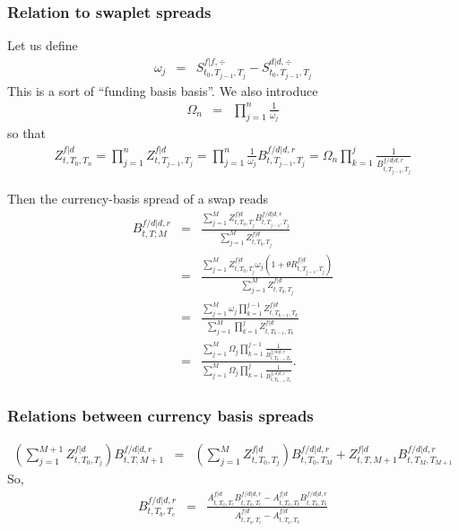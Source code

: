 \documentclass[11pt,english]{amsart}
\theoremstyle{definition}
\begin{document}
\subsubsection{Relation to swaplet spreads}
Let us define  
\begin{eqnarray}
	\omega_j  &=& S^{f|f,\div}_{t_0,T_{j-1},T_j}  -  S^{d|d,\div}_{t_0,T_{j-1},T_j} 
\end{eqnarray}
This is a sort of ``funding basis basis''. We also introduce 
\begin{eqnarray}
	\Omega_n &=& \prod_{j=1}^n \frac{1}{\omega_j}
\end{eqnarray}
so that
\begin{eqnarray*}
	Z^{f|d}_{t,T_0,T_n} 
	= \prod_{j=1}^n Z^{f|d}_{t,T_{j-1},T_j}  
	= \prod_{j=1}^n \frac{1}{\omega_j} B^{f/d|d,r}_{t,T_{j-1},T_j}  
	= \Omega_n \prod_{k=1}^j \frac{1}{B^{f/d|d,r}_{t,T_{j-1},T_j}}  
\end{eqnarray*}


Then the currency-basis spread of a swap reads  
\begin{eqnarray*}
	B^{f/d|d,r}_{t,T;M}  
	&=& \frac{\sum_{j=1}^{M}   Z^{f|d}_{t,T_0,T_j} B^{f/d|d,r}_{t,T_{j-1},T_j}  
	}{\sum_{j=1}^{M}  Z^{f|d}_{t,T_0,T_j}} \\
	&=& \frac{ \sum_{j=1}^{M}   Z^{f|d}_{t,T_0,T_j} \omega_j \left(1+\theta R^{f|d}_{t,T_{j-1},T_j}\right) }{\sum_{j=1}^{M}  Z^{f|d}_{t,T_0,T_j}} \\
	&=& 
	 \frac{ \sum_{j=1}^{M} \omega_j \prod_{k=1}^{j-1} Z^{f|d}_{t,T_{k-1},T_{k}} } {  \sum_{j=1}^{M}  \prod_{k=1}^{j} Z^{f|d}_{t,T_{k-1},T_{k}}  } \\
	&=& 
	\frac{ \sum_{j=1}^{M} \Omega_j \prod_{k=1}^{j-1} \frac{1}{B^{f/d|d,r}_{t,T_{k-1},T_k}}} {  \sum_{j=1}^{M}  \Omega_j \prod_{k=1}^{j} \frac{1}{B^{f/d|d,r}_{t,T_{k-1},T_k}}  } .
\end{eqnarray*}

\subsubsection{Relations between currency basis spreads}

\begin{eqnarray*}
	\left( \sum_{j=1}^{M+1}  Z^{f|d}_{t,T_0,T_j} \right) B^{f/d|d,r}_{t,T,M+1}  
	&=& \left( \sum_{j=1}^{M}  Z^{f|d}_{t,T_0,T_j} \right) B^{f/d|d,r}_{t,T_0,T_{M}}  + Z^{f|d}_{t,T,M+1} B^{f/d|d,r}_{t,T_{M},T_{M+1}}  
\end{eqnarray*}
So, 
\begin{eqnarray*}
	B^{f/d|d,r}_{t,T_{b},T_{c}} &=&  \frac{A^{f|d}_{t,T_a,T_{c}} B^{f/d|d,r}_{t,T_a,T_{c}}  - A^{f|d}_{t,T_a,T_{b}} B^{f/d|d,r}_{t,T_a,T_b} }
	{  A^{f|d}_{t,T_a,T_c} - A^{f|d}_{t,T_a,T_b} } 
\end{eqnarray*}
\end{document}
